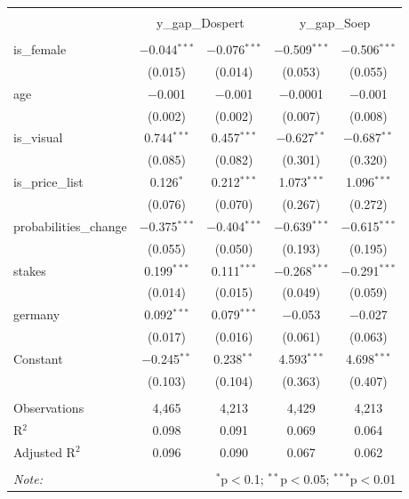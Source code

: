 \documentclass[12pt]{article}
\begin{document}
\begin{table}[!htbp] \centering 

  \label{} 
\small 
\begin{tabular}{@{\extracolsep{-5pt}}lcccc} 
\\[-1.8ex]\\[-1.8ex] & \multicolumn{2}{c}{y\_gap\_Dospert} & \multicolumn{2}{c}{y\_gap\_Soep} \\ 
\hline \\[-1.8ex] 
 is\_female & $-$0.044$^{***}$ & $-$0.076$^{***}$ & $-$0.509$^{***}$ & $-$0.506$^{***}$ \\ 
  & (0.015) & (0.014) & (0.053) & (0.055) \\ 
  age & $-$0.001 & $-$0.001 & $-$0.0001 & $-$0.001 \\ 
  & (0.002) & (0.002) & (0.007) & (0.008) \\ 
  is\_visual & 0.744$^{***}$ & 0.457$^{***}$ & $-$0.627$^{**}$ & $-$0.687$^{**}$ \\ 
  & (0.085) & (0.082) & (0.301) & (0.320) \\ 
  is\_price\_list & 0.126$^{*}$ & 0.212$^{***}$ & 1.073$^{***}$ & 1.096$^{***}$ \\ 
  & (0.076) & (0.070) & (0.267) & (0.272) \\ 
  probabilities\_change & $-$0.375$^{***}$ & $-$0.404$^{***}$ & $-$0.639$^{***}$ & $-$0.615$^{***}$ \\ 
  & (0.055) & (0.050) & (0.193) & (0.195) \\ 
  stakes & 0.199$^{***}$ & 0.111$^{***}$ & $-$0.268$^{***}$ & $-$0.291$^{***}$ \\ 
  & (0.014) & (0.015) & (0.049) & (0.059) \\ 
  germany & 0.092$^{***}$ & 0.079$^{***}$ & $-$0.053 & $-$0.027 \\ 
  & (0.017) & (0.016) & (0.061) & (0.063) \\ 
  Constant & $-$0.245$^{**}$ & 0.238$^{**}$ & 4.593$^{***}$ & 4.698$^{***}$ \\ 
  & (0.103) & (0.104) & (0.363) & (0.407) \\ 
 \hline \\[-1.8ex] 
Observations & 4,465 & 4,213 & 4,429 & 4,213 \\ 
R$^{2}$ & 0.098 & 0.091 & 0.069 & 0.064 \\ 
Adjusted R$^{2}$ & 0.096 & 0.090 & 0.067 & 0.062 \\ 
\hline \\[-1.8ex] 
\textit{Note:}  & \multicolumn{4}{r}{$^{*}$p$<$0.1; $^{**}$p$<$0.05; $^{***}$p$<$0.01} \\ 
\end{tabular} 
\end{table}
\end{document}

